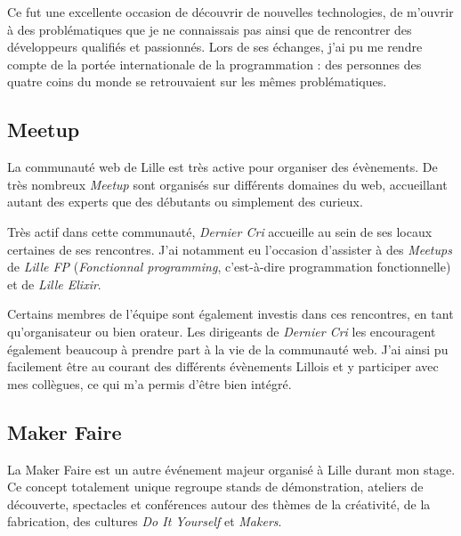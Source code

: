 \documentclass[12pt,a4paper]{article}
\begin{document}
  \bigskip

  Ce fut une excellente occasion de découvrir de nouvelles technologies,
  de m'ouvrir à des problématiques que je ne connaissais pas ainsi que de
  rencontrer des développeurs qualifiés et passionnés. Lors de ses
  échanges, j'ai pu me rendre compte de la portée internationale de la
  programmation : des personnes des quatre coins du monde se retrouvaient
  sur les mêmes problématiques.

  \bigskip

  \subsection{Meetup}\label{meetup}

  \bigskip

  La communauté web de Lille est très active pour organiser des
  évènements. De très nombreux \emph{Meetup} sont organisés sur différents
  domaines du web, accueillant autant des experts que des débutants ou
  simplement des curieux.

  \bigskip

  Très actif dans cette communauté, \emph{Dernier Cri} accueille au sein
  de ses locaux certaines de ses rencontres. J'ai notamment eu l'occasion
  d'assister à des \emph{Meetups} de \emph{Lille FP} (\emph{Fonctionnal
  programming}, c'est-à-dire programmation fonctionnelle) et de
  \emph{Lille Elixir}.

  \bigskip

  Certains membres de l'équipe sont également investis dans ces
  rencontres, en tant qu'organisateur ou bien orateur. Les dirigeants de
  \emph{Dernier Cri} les encouragent également beaucoup à prendre part à
  la vie de la communauté web. J'ai ainsi pu facilement être au courant
  des différents évènements Lillois et y participer avec mes collègues, ce
  qui m'a permis d'être bien intégré.

  \bigskip

  \subsection{Maker Faire}\label{maker-faire}

  \bigskip

  La Maker Faire est un autre événement majeur organisé à Lille durant mon
  stage. Ce concept totalement unique regroupe stands de démonstration,
  ateliers de découverte, spectacles et conférences autour des thèmes de
  la créativité, de la fabrication, des cultures \emph{Do It Yourself} et
  \emph{Makers}.
\end{document}
